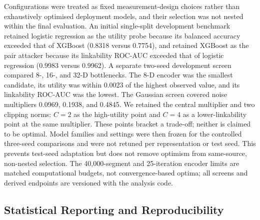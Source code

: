 \documentclass[journal]{IEEEtran}
\begin{document}
Configurations were treated as fixed measurement-design choices rather than
exhaustively optimised deployment models, and their selection was not nested
within the final evaluation. An initial single-split development
benchmark retained logistic regression as the utility probe because its
balanced accuracy exceeded that of XGBoost (0.8318 versus 0.7754), and retained
XGBoost as the pair attacker because its linkability ROC-AUC exceeded that of
logistic regression (0.9983 versus 0.9962). A separate two-seed development
screen compared 8-, 16-, and 32-D bottlenecks. The 8-D encoder was the smallest
candidate, its utility was within 0.0023 of the highest observed value, and its
linkability ROC-AUC was the lowest. The Gaussian screen covered noise
multipliers 0.0969, 0.1938, and 0.4845. We retained the central multiplier and
  two clipping norms: $C=2$ as the high-utility point and $C=4$ as a
  lower-linkability point at the same multiplier. These points bracket a
trade-off; neither is claimed to be optimal. Model families and settings were
then frozen for the controlled three-seed comparisons and were not retuned per
representation or test seed. This prevents test-seed adaptation but does not
remove optimism from same-source, non-nested selection. The 40,000-segment and
25-iteration encoder limits are matched computational budgets, not
convergence-based optima; all screens and derived endpoints are versioned with
the analysis code.

\subsection{Statistical Reporting and Reproducibility}
\label{subsec:reproducibility}
\end{document}

